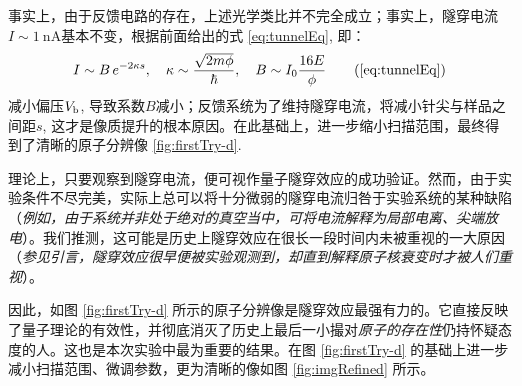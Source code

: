 \documentclass[aps,pre,12pt,preprint,%
	onecolumn,showpacs,showkeys,nofootinbib]{revtex4-1}
\begin{document}
	事实上，由于反馈电路的存在，上述光学类比并不完全成立；事实上，隧穿电流$I\sim\SI{1}{\nA}$基本不变，根据前面给出的式 \eqref{eq:tunnelEq}, 即：
	\begin{equation}
		I \sim B\,e^{-2\kappa s},\quad
		\kappa \sim \frac{\sqrt{2m\phi}}{\hbar},\quad
		B \sim I_0 \frac{16E}{\phi}
		\tag{\ref{eq:tunnelEq}}
	\end{equation}
	减小偏压$V_\textup{b}$, 导致系数$B$减小；反馈系统为了维持隧穿电流，将减小针尖与样品之间距$s$, 这才是像质提升的根本原因。在此基础上，进一步缩小扫描范围，最终得到了清晰的原子分辨像 \ref{fig:firstTry-d}. 
	
	\newparagraph
	理论上，只要观察到隧穿电流，便可视作量子隧穿效应的成功验证。然而，由于实验条件不尽完美，实际上总可以将十分微弱的隧穿电流归咎于实验系统的某种缺陷（\textit{例如，由于系统并非处于绝对的真空当中，可将电流解释为局部电离、尖端放电}）。我们推测，这可能是历史上隧穿效应在很长一段时间内未被重视的一大原因（\textit{参见引言，隧穿效应很早便被实验观测到，却直到解释原子核衰变时才被人们重视}）。
	
	因此，如图 \ref{fig:firstTry-d} 所示的原子分辨像是隧穿效应最强有力的。它直接反映了量子理论的有效性，并彻底消灭了历史上最后一小撮对\textit{原子的存在性}仍持怀疑态度的人\supercite{gamow2012one}。这也是本次实验中最为重要的结果。在图 \ref{fig:firstTry-d} 的基础上进一步减小扫描范围、微调参数，更为清晰的像如图 \ref{fig:imgRefined} 所示。
	
\end{document}
